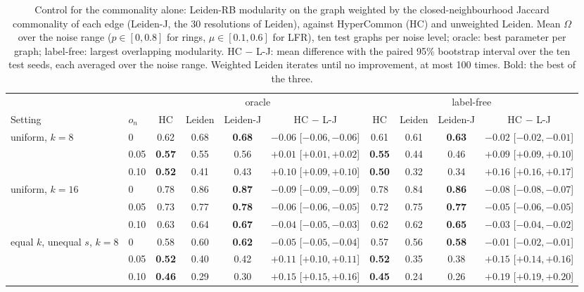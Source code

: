 \begin{table}[p]
\caption{Control for the commonality alone: Leiden-RB modularity on the graph weighted by the closed-neighbourhood Jaccard commonality of each edge (Leiden-J, the 30 resolutions of Leiden), against HyperCommon (HC) and unweighted Leiden. Mean $\Omega$ over the noise range ($p\in[0,0.8]$ for rings, $\mu\in[0.1,0.6]$ for LFR), ten test graphs per noise level; oracle: best parameter per graph; label-free: largest overlapping modularity. HC $-$ L-J: mean difference with the paired 95\% bootstrap interval over the ten test seeds, each averaged over the noise range. Weighted Leiden iterates until no improvement, at most 100 times. Bold: the best of the three.}
\label{tab:S-jaccard-control}
\scriptsize\setlength{\tabcolsep}{3pt}
\begin{ruledtabular}
\begin{tabular}{llccc c|ccc c}
 & & \multicolumn{4}{c|}{oracle} & \multicolumn{4}{c}{label-free} \\
Setting & $o_n$ & HC & Leiden & Leiden-J & HC $-$ L-J & HC & Leiden & Leiden-J & HC $-$ L-J \\
\hline
uniform, $k{=}8$ & 0 & 0.62 & 0.68 & \textbf{0.68} & $-0.06$ [$-0.06,-0.06$] & 0.61 & 0.61 & \textbf{0.63} & $-0.02$ [$-0.02,-0.01$] \\
 & 0.05 & \textbf{0.57} & 0.55 & 0.56 & $+0.01$ [$+0.01,+0.02$] & \textbf{0.55} & 0.44 & 0.46 & $+0.09$ [$+0.09,+0.10$] \\
 & 0.10 & \textbf{0.52} & 0.41 & 0.43 & $+0.10$ [$+0.09,+0.10$] & \textbf{0.50} & 0.32 & 0.34 & $+0.16$ [$+0.16,+0.17$] \\
uniform, $k{=}16$ & 0 & 0.78 & 0.86 & \textbf{0.87} & $-0.09$ [$-0.09,-0.09$] & 0.78 & 0.84 & \textbf{0.86} & $-0.08$ [$-0.08,-0.07$] \\
 & 0.05 & 0.73 & 0.77 & \textbf{0.78} & $-0.06$ [$-0.06,-0.05$] & 0.72 & 0.75 & \textbf{0.77} & $-0.05$ [$-0.06,-0.05$] \\
 & 0.10 & 0.63 & 0.64 & \textbf{0.67} & $-0.04$ [$-0.05,-0.03$] & 0.62 & 0.62 & \textbf{0.65} & $-0.03$ [$-0.04,-0.02$] \\
equal $k$, unequal $s$, $k{=}8$ & 0 & 0.58 & 0.60 & \textbf{0.62} & $-0.05$ [$-0.05,-0.04$] & 0.57 & 0.56 & \textbf{0.58} & $-0.01$ [$-0.02,-0.01$] \\
 & 0.05 & \textbf{0.52} & 0.40 & 0.42 & $+0.11$ [$+0.10,+0.11$] & \textbf{0.52} & 0.35 & 0.38 & $+0.15$ [$+0.14,+0.16$] \\
 & 0.10 & \textbf{0.46} & 0.29 & 0.30 & $+0.15$ [$+0.15,+0.16$] & \textbf{0.45} & 0.24 & 0.26 & $+0.19$ [$+0.19,+0.20$] \\

\end{tabular}
\end{ruledtabular}
\end{table}
